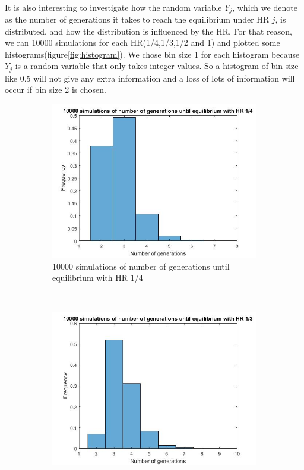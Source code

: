 \\
It is also interesting to investigate how the random variable $Y_j$, which we denote as the number of generations it takes to reach the equilibrium under HR $j$, is distributed, and how the distribution is influenced by the HR. For that reason, we ran 10000 simulations for each HR(1/4,1/3,1/2 and 1) and plotted some histograms(figure\ref{fig:histogram}). We chose bin size 1 for each histogram because $Y_j$ is a random variable that only takes integer values. So a histogram of bin size like 0.5 will not give any extra information and a loss of lots of information will occur if bin size 2 is chosen. 
\\
 
\begin{figure}[H]
	
    \centering
    \begin{subfigure}{0.4\textwidth}
        \includegraphics[width=\textwidth]{GenormHistogramAantalgen4}
        \caption{10000 simulations of number of generations until equilibrium with HR 1/4}
        \label{fig:gull}
    \end{subfigure}
    ~ %
    \begin{subfigure}{0.4\textwidth}
        \includegraphics[width=\textwidth]{GenormHistogramAantalgen}

\end{subfigure}
\end{figure}
